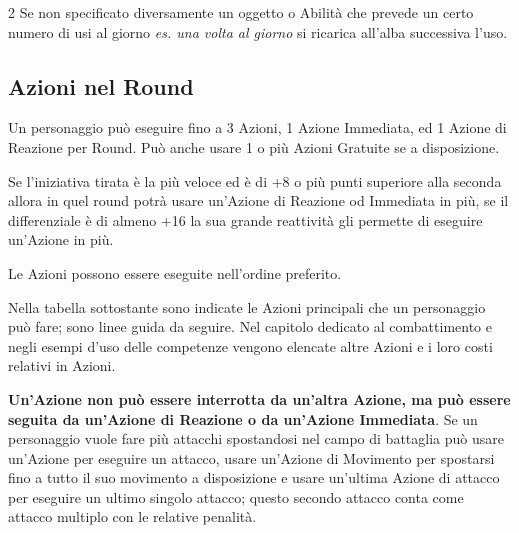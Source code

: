 \begin{multicols}{2}
Se non specificato diversamente un oggetto o Abilità che prevede un certo numero di usi al giorno \emph{es. una volta al giorno} si ricarica all'alba successiva l'uso.



\subsection{Azioni nel Round}\label{azioninelround}


Un personaggio può eseguire fino a 3 Azioni, 1 Azione Immediata, ed 1 Azione di Reazione per Round. Può anche usare 1 o più Azioni Gratuite se a disposizione.

Se l'iniziativa tirata è la più veloce ed è di +8 o più punti superiore alla seconda allora in quel round potrà usare un'Azione di Reazione od Immediata in più, se il differenziale è di almeno +16 la sua grande reattività gli permette di eseguire un'Azione in più.

Le Azioni possono essere eseguite nell'ordine preferito.

Nella tabella sottostante sono indicate le Azioni principali che un personaggio può fare; sono linee guida da seguire. Nel capitolo dedicato al combattimento e negli esempi d'uso delle competenze vengono elencate altre Azioni e i loro costi relativi in Azioni.

\textbf{Un'Azione non può essere interrotta da un'altra Azione, ma può essere seguita da un'Azione di Reazione o da un'Azione Immediata}. 
Se un personaggio vuole fare più attacchi spostandosi nel campo di battaglia può usare un'Azione per eseguire un attacco, usare un'Azione di Movimento per spostarsi fino a tutto il suo movimento a disposizione e usare un'ultima Azione di attacco per eseguire un ultimo singolo attacco; questo secondo attacco conta come attacco multiplo con le relative penalità.


\end{multicols}
